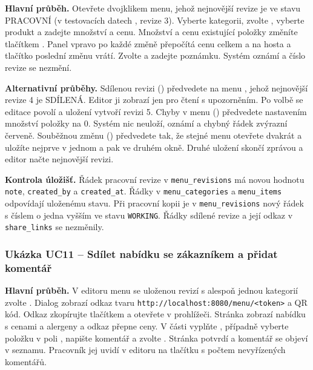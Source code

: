 \textbf{Hlavní průběh.} Otevřete dvojklikem menu, jehož nejnovější revize je ve stavu PRACOVNÍ (v testovacích datech , revize 3). Vyberte kategorii, zvolte , vyberte produkt a zadejte množství a cenu. Množství a cenu existující položky změníte tlačítkem . Panel vpravo po každé změně přepočítá cenu celkem a na hosta a tlačítko  poslední změnu vrátí. Zvolte  a zadejte poznámku. Systém oznámí  a číslo revize se nezmění.

\textbf{Alternativní průběhy.} Sdílenou revizi () předvedete na menu , jehož nejnovější revize 4 je SDÍLENÁ. Editor ji zobrazí jen pro čtení s upozorněním. Po volbě  se editace povolí a uložení vytvoří revizi 5. Chyby v menu () předvedete nastavením množství položky na 0. Systém nic neuloží, oznámí  a chybný řádek zvýrazní červeně. Souběžnou změnu () předvedete tak, že stejné menu otevřete dvakrát a uložíte nejprve v jednom a pak ve druhém okně. Druhé uložení skončí zprávou  a editor načte nejnovější revizi.

\textbf{Kontrola úložišť.} Řádek pracovní revize v \texttt{menu\_revisions} má novou hodnotu \texttt{note}, \texttt{created\_by} a \texttt{created\_at}. Řádky v \texttt{menu\_categories} a \texttt{menu\_items} odpovídají uloženému stavu. Při pracovní kopii je v \texttt{menu\_revisions} nový řádek s číslem o jedna vyšším ve stavu \texttt{WORKING}. Řádky sdílené revize a její odkaz v \texttt{share\_links} se nezměnily.

\subsubsection{Ukázka UC11 -- Sdílet nabídku se zákazníkem a přidat komentář}

\textbf{Hlavní průběh.} V editoru menu se uloženou revizí s alespoň jednou kategorií zvolte . Dialog zobrazí odkaz tvaru \texttt{http://localhost:8080/menu/<token>} a QR kód. Odkaz zkopírujte tlačítkem  a otevřete v prohlížeči. Stránka zobrazí nabídku s cenami a alergeny a odkaz  přepne ceny. V části  vyplňte , případně vyberte položku v poli , napište komentář a zvolte . Stránka potvrdí  a komentář se objeví v seznamu. Pracovník jej uvidí v editoru na tlačítku s počtem nevyřízených komentářů.


